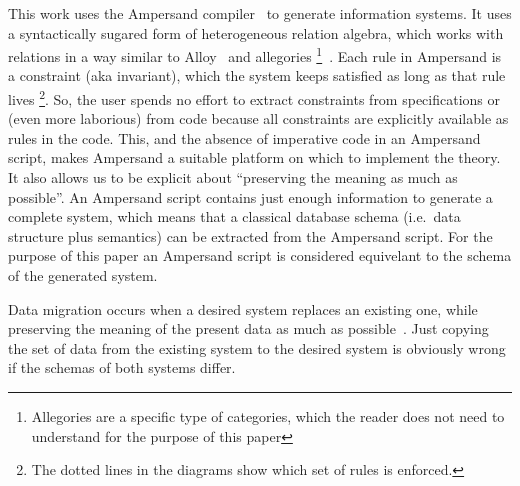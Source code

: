 \documentclass{elsarticle}
\begin{document}
   This work uses the Ampersand compiler~\cite{Joosten-JLAMP2018, JoostenRAMiCS2017} to generate information systems.
   It uses a syntactically sugared form of heterogeneous relation algebra,
   which works with relations in a way similar to Alloy~\cite{Alloy2006} and allegories%
\footnote{Allegories are a specific type of categories, which the reader does not need to understand for the purpose of this paper}~\cite{Zielinski2013}.
   Each rule in Ampersand is a constraint (aka invariant), which the system keeps satisfied as long as that rule lives%
\footnote{The dotted lines in the diagrams show which set of rules is enforced.}.
   So, the user spends no effort to extract constraints from specifications or (even more laborious) from code
   because all constraints are explicitly available as rules in the code.
   This, and the absence of imperative code in an Ampersand script, makes Ampersand a suitable platform on which to implement the theory.
   It also allows us to be explicit about ``preserving the meaning as much as possible''.
   An Ampersand script contains just enough information to generate a complete system,
   which means that a classical database schema (i.e.\ data structure plus semantics) can be extracted from the Ampersand script.
   For the purpose of this paper an Ampersand script is considered equivelant to the schema of the generated system.

   Data migration occurs when a desired system replaces an existing one,
   while preserving the meaning of the present data as much as possible~\cite{Spivak2012}.
   Just copying the set of data from the existing system to the desired system is obviously wrong if the schemas of both systems differ.
\end{document}
